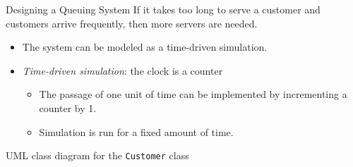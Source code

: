 \documentclass[14pt,aspectratio=1610]{beamer}
\begin{document}
\begin{frame}{Designing a Queuing System}
  If it takes too long to serve a customer and customers arrive frequently, then more servers are needed.

  \begin{itemize}
    \item 
      The system can be modeled as a time-driven simulation.
    \item 
      \emph{Time-driven simulation}: the clock is a counter
      \begin{itemize}
        \item 
        The passage of one unit of time can be implemented by incrementing a counter by 1.
        \item 
          Simulation is run for a fixed amount of time.
      \end{itemize}
  \end{itemize}
\end{frame}

\begin{frame}{UML class diagram for the \texttt{Customer} class}
  \center
  \renewcommand{\umlfillcolor}{CSUblue!80!black}
  \renewcommand{\umldrawcolor}{white}
  \renewcommand{\umltextcolor}{white}
\end{frame}
\end{document}
